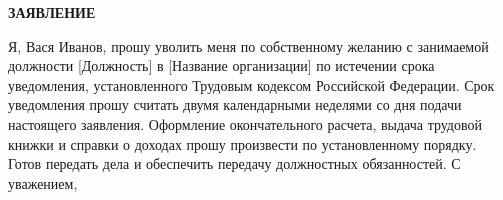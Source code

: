 \documentclass[12pt]{article}
\begin{document}
\begin{center}
\textbf{\LARGE ЗАЯВЛЕНИЕ}
\end{center}

\vspace{1cm}

Я, Вася Иванов, прошу уволить меня по собственному желанию с занимаемой должности [Должность] в [Название организации] по истечении срока уведомления, установленного Трудовым кодексом Российской Федерации. Срок уведомления прошу считать двумя календарными неделями со дня подачи настоящего заявления. Оформление окончательного расчета, выдача трудовой книжки и справки о доходах прошу произвести по установленному порядку. Готов передать дела и обеспечить передачу должностных обязанностей. С уважением,
\end{document}
